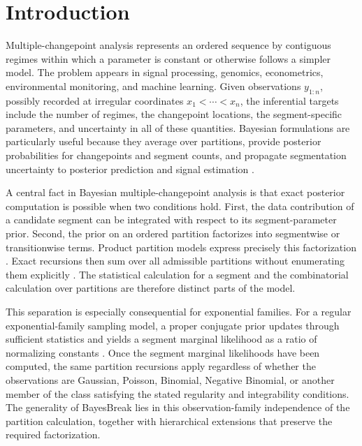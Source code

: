 \section{Introduction}
\label{sec:introduction}

Multiple-changepoint analysis represents an ordered sequence by contiguous regimes within which a parameter is constant or otherwise follows a simpler model. The problem appears in signal processing, genomics, econometrics, environmental monitoring, and machine learning. Given observations $y_{1:n}$, possibly recorded at irregular coordinates $x_1<\cdots<x_n$, the inferential targets include the number of regimes, the changepoint locations, the segment-specific parameters, and uncertainty in all of these quantities. Bayesian formulations are particularly useful because they average over partitions, provide posterior probabilities for changepoints and segment counts, and propagate segmentation uncertainty to posterior prediction and signal estimation \citep{barry1992ppm,barry1993bayesCP,fearnhead2006exact,hutter2006bpcr}.

A central fact in Bayesian multiple-changepoint analysis is that exact posterior computation is possible when two conditions hold. First, the data contribution of a candidate segment can be integrated with respect to its segment-parameter prior. Second, the prior on an ordered partition factorizes into segmentwise or transitionwise terms. Product partition models express precisely this factorization \citep{barry1992ppm,barry1993bayesCP}. Exact recursions then sum over all admissible partitions without enumerating them explicitly \citep{fearnhead2006exact,hutter2006bpcr}. The statistical calculation for a segment and the combinatorial calculation over partitions are therefore distinct parts of the model.

This separation is especially consequential for exponential families. For a regular exponential-family sampling model, a proper conjugate prior updates through sufficient statistics and yields a segment marginal likelihood as a ratio of normalizing constants \citep{diaconis1979conjugate,bernardo1994bayesian}. Once the segment marginal likelihoods have been computed, the same partition recursions apply regardless of whether the observations are Gaussian, Poisson, Binomial, Negative Binomial, or another member of the class satisfying the stated regularity and integrability conditions. The generality of BayesBreak lies in this observation-family independence of the partition calculation, together with hierarchical extensions that preserve the required factorization.

